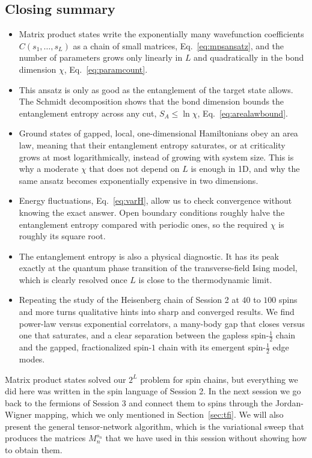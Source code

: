 \documentclass[lecture_notes.tex]{subfiles}
\begin{document}
\subsection*{Closing summary}
\begin{itemize}[nosep]
  \item Matrix product states write the exponentially many wavefunction coefficients
    $C(s_1,\ldots,s_L)$ as a chain of small matrices, Eq.~\eqref{eq:mpsansatz}, and the number of
    parameters grows only linearly in $L$ and quadratically in the bond dimension $\chi$,
    Eq.~\eqref{eq:paramcount}.
  \item This ansatz is only as good as the entanglement of the target state allows. The Schmidt
    decomposition shows that the bond dimension bounds the entanglement entropy across any cut,
    $S_A \le \ln\chi$, Eq.~\eqref{eq:arealawbound}.
  \item Ground states of gapped, local, one-dimensional Hamiltonians obey an area law, meaning that
    their entanglement entropy saturates, or at criticality grows at most logarithmically, instead
    of growing with system size. This is why a moderate $\chi$ that does not depend on $L$ is
    enough in 1D, and why the same ansatz becomes exponentially expensive in two dimensions.
  \item Energy fluctuations, Eq.~\eqref{eq:varH}, allow us to check convergence without knowing
    the exact answer. Open boundary conditions roughly halve the entanglement entropy compared with
    periodic ones, so the required $\chi$ is roughly its square root.
  \item The entanglement entropy is also a physical diagnostic. It has its peak exactly at the
    quantum phase transition of the transverse-field Ising model, which is clearly resolved once
    $L$ is close to the thermodynamic limit.
  \item Repeating the study of the Heisenberg chain of Session 2 at $40$ to $100$ spins and more
    turns qualitative hints into sharp and converged results. We find power-law versus
    exponential correlators, a many-body gap that closes versus one that saturates, and a clear
    separation between the gapless spin-$\tfrac12$ chain and the gapped, fractionalized spin-$1$
    chain with its emergent spin-$\tfrac12$ edge modes.
\end{itemize}

Matrix product states solved our $2^L$ problem for spin chains, but everything we did here was
written in the spin language of Session 2. In the next session we go back to the fermions of
Session 3 and connect them to spins through the Jordan-Wigner mapping, which we only mentioned in
Section~\ref{sec:tfi}. We will also present the general tensor-network algorithm, which is the
variational sweep that produces the matrices $M_n^{s_n}$ that we have used in this session without
showing how to obtain them.
\end{document}
